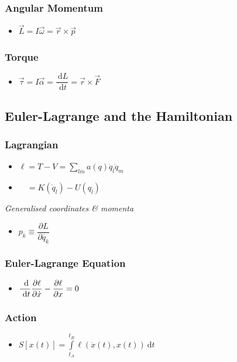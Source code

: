 \documentclass[]{report}
\newcommand \tab[1][1cm]{\hspace*{#1}}
\newcommand{\dn}[1]{\ \mathrm{d}#1}
\newcommand{\dd}[2]{ \dfrac{\dn #1}{\dn #2}}
\newcommand{\pp}[2]{\dfrac{\partial #1}{\partial #2}}
\newcommand{\itemt}{\item \tab}
\begin{document}
\subsubsection{Angular Momentum}
\begin{itemize}
\itemt \( \vec{L} = I\vec{\omega} = \vec{r} \times \vec{p}\)
\end{itemize}

\subsubsection{Torque}
\begin{itemize}
\item \( \vec{\tau} = I\vec{\alpha} = \dd{L}{t} = \vec{r} \times \vec{F}\)
\end{itemize}

\subsection{Euler-Lagrange and the Hamiltonian}	

\subsubsection{Lagrangian}			
\begin{itemize}
\itemt \(\ell = T - V = \sum\limits_{lm} a(q)\dot{q}_l\dot{q}_m \)
\itemt \ \ \( = K(\dot{q}_l) - U(q_l)\)
\end{itemize}

\textit{Generalised coordinates \& momenta}
\begin{itemize}
\itemt \( p_k \equiv \pp{L}{\dot{q_k}}\)
\end{itemize}

\subsubsection{Euler-Lagrange Equation}			
\begin{itemize}
\itemt \( \dd{}{t} \pp{\ell}{\dot{x}} - \pp{\ell}{x} = 0\)
\end{itemize}

\subsubsection{Action}			
\begin{itemize}
\itemt \(S[x(t)] = \int\limits_{t_A}^{t_B} \ell(\dot{x}(t),x(t)) \dn t\)
\end{itemize}			
\end{document}
